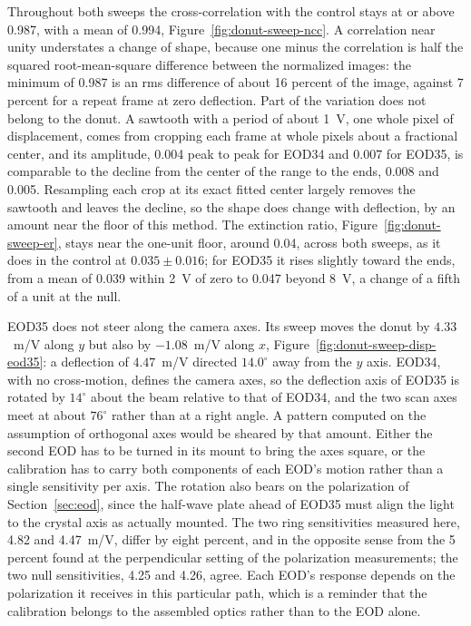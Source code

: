 \documentclass{article}
\begin{document}
Throughout both sweeps the cross-correlation with the control stays at or above 0.987, with a mean
of 0.994, Figure~\ref{fig:donut-sweep-ncc}. A correlation near unity understates a change of
shape, because one minus the correlation is half the squared root-mean-square difference between
the normalized images: the minimum of 0.987 is an rms difference of about 16 percent of the image,
against 7 percent for a repeat frame at zero deflection. Part of the variation does not belong to
the donut. A sawtooth with a period of about 1~V, one whole pixel of displacement, comes from
cropping each frame at whole pixels about a fractional center, and its amplitude, 0.004 peak to
peak for EOD34 and 0.007 for EOD35, is comparable to the decline from the center of the range to
the ends, 0.008 and 0.005. Resampling each crop at its exact fitted center largely removes the
sawtooth and leaves the decline, so the shape does change with deflection, by an amount near the
floor of this method. The extinction ratio, Figure~\ref{fig:donut-sweep-er}, stays near the
one-unit floor, around 0.04, across both sweeps, as it does in the control at $0.035\pm0.016$; for
EOD35 it rises slightly toward the ends, from a mean of 0.039 within 2~V of zero to 0.047 beyond
8~V, a change of a fifth of a unit at the null.

EOD35 does not steer along the camera axes. Its sweep moves the donut by $4.33$~\textmu m/V along
$y$ but also by $-1.08$~\textmu m/V along $x$, Figure~\ref{fig:donut-sweep-disp-eod35}: a
deflection of $4.47$~\textmu m/V directed $14.0^\circ$ away from the $y$ axis. EOD34, with no
cross-motion, defines the camera axes, so the deflection axis of EOD35 is rotated by
$14^\circ$ about the beam relative to that of EOD34, and the two scan axes meet at about $76^\circ$
rather than at a right angle. A pattern computed on the assumption of orthogonal axes would be
sheared by that amount. Either the second EOD has to be turned in its mount to bring the
axes square, or the calibration has to carry both components of each EOD's motion rather
than a single sensitivity per axis. The rotation also bears on the polarization of
Section~\ref{sec:eod}, since the half-wave plate ahead of EOD35 must align the light to the crystal
axis as actually mounted. The two ring sensitivities measured here, 4.82 and 4.47~\textmu m/V,
differ by eight percent, and in the opposite sense from the 5 percent found at the perpendicular
setting of the polarization measurements; the two null sensitivities, 4.25 and 4.26, agree. Each EOD's response depends on the polarization it receives in
this particular path, which is a reminder that the calibration belongs to the assembled optics rather
than to the EOD alone.
\end{document}
